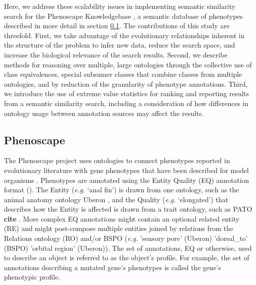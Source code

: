 \documentclass{article}
\begin{document}
Here, we address these scalability issues in implementing semantic similarity search for the Phenoscape Knowledgebase \cite{manda2015using}, a semantic database of phenotypes described in more detail in section \ref{kb}. The contributions of this study are threefold. First, we take advantage of the evolutionary relationships inherent in the structure of the problem to infer new data, reduce the search space, and increase the biological relevance of the search results.  Second, we describe methods for reasoning over multiple, large ontologies through the collective use of class equivalences, special subsumer classes that combine classes from multiple ontologies, and by reduction of the granularity of phenotype annotations. Third, we introduce the use of extreme value statistics for ranking and reporting results from a semantic similarity search, including a consideration of how differences in ontology usage between annotation sources may affect the results.



\subsection{Phenoscape}
\label{kb}

The Phenoscape project uses ontologies to connect phenotypes reported in evolutionary literature with gene phenotypes that have been described for model organisms \cite{dahdul2010evolutionary,mabee2012500}. Phenotypes are annotated using the Entity Quality (EQ) annotation format (\cite{mungall2010integrating}). The Entity ({\it e.g.} `anal fin') is drawn from one ontology, such as the animal anatomy ontology Uberon \cite{haendel2014unification}, and the Quality ({\it e.g.} `elongated') that describes how the Entity is affected is drawn from a trait ontology, such as PATO \textbf{cite} \cite{mungall2010integrating}. More complex EQ annotations might contain an optional related entity (RE) and might post-compose multiple entities joined by relations from the Relations ontology (RO) and/or BSPO ({\it e.g.} 'sensory pore' (Uberon) 'dorsal\_to' (BSPO) 'orbital region' (Uberon)). The set of annotations, EQ or otherwise, used to describe an object is referred to as the object's profile. For example, the set of annotations describing a mutated gene's phenotypes is called the gene's phenotypic profile. 
\end{document}
